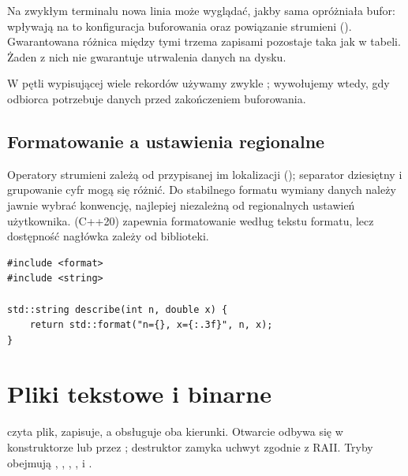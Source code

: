 Na zwykłym terminalu nowa linia może wyglądać, jakby sama opróżniała
bufor: wpływają na to konfiguracja buforowania oraz powiązanie strumieni
(). Gwarantowana różnica między tymi trzema zapisami pozostaje
taka jak w tabeli. Żaden z nich nie gwarantuje utrwalenia danych na dysku.

W pętli wypisującej wiele rekordów używamy zwykle ;
 wywołujemy wtedy, gdy odbiorca potrzebuje danych
przed zakończeniem buforowania.

\subsection{Formatowanie a ustawienia regionalne}

Operatory strumieni zależą od przypisanej im lokalizacji
(); separator dziesiętny i grupowanie cyfr mogą się
różnić. Do stabilnego formatu wymiany danych należy jawnie wybrać
konwencję, najlepiej niezależną od regionalnych ustawień użytkownika.
 (C++20) zapewnia formatowanie według tekstu formatu,
lecz dostępność nagłówka  zależy od biblioteki.

\begin{lstlisting}[caption={Formatowanie C++20 -- wymaga obslugi <format>.}]
#include <format>
#include <string>

std::string describe(int n, double x) {
    return std::format("n={}, x={:.3f}", n, x);
}
\end{lstlisting}

\section{Pliki tekstowe i binarne}
\label{sec:cpp19-files}

 czyta plik,  zapisuje,
a  obsługuje oba kierunki. Otwarcie odbywa się
w konstruktorze lub przez ; destruktor zamyka uchwyt
zgodnie z RAII. Tryby obejmują , ,
, ,  i .

